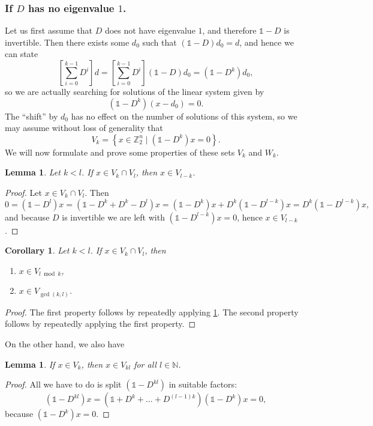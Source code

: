 \documentclass[a4paper]{article}
\theoremstyle{plain}
\newtheorem{lemma}[theorem]{Lemma}
\newtheorem{corollary}[theorem]{Corollary}
\theoremstyle{definition}
\theoremstyle{remark}
\newcommand{\I}{\mathds{1}}
\newcommand{\NN}{{\mathbb{N}}}
\newcommand{\ZZ}{{\mathbb{Z}}}
\begin{document}
\subsubsection{If \(D\) has no eigenvalue \(1\).}
Let us first assume that \(D\) does not have eigenvalue \(1\), and therefore \(\I-D\) is invertible. Then there exists some \(d_0\) such that \((\I-D)d_0 = d\), and hence we can state
\begin{equation*}
\left[\sum_{i=0}^{k-1}D^i\right] d =   \left[\sum_{i=0}^{k-1}D^i\right] (\I - D)d_0 = (\I-D^k)d_0,
\end{equation*}
so we are actually searching for solutions of the linear system given by
\begin{equation*}
(\I - D^k)(x-d_0) = 0.
\end{equation*}
The ``shift'' by \(d_0\) has no effect on the number of solutions of this system, so we may assume without loss of generality that
\begin{equation*}
V_k = \left\{x \in \ZZ_2^n  \;|\; (\I - D^k)x = 0\right\}.
\end{equation*}
We will now formulate and prove some properties of these sets \(V_k\) and \(W_k\).
\begin{lemma}
	\label{lem:vkvl=>vl-k}
	Let \(k < l\). If \(x \in V_k \cap V_l\), then \(x \in V_{l-k}\).
\end{lemma}
\begin{proof}
	Let \(x \in V_k \cap V_l\). Then
	\begin{equation*}
	0 = (\I-D^l)x = (\I-D^k +D^k - D^l)x = (\I - D^k)x + D^k(\I - D^{l-k})x = D^k(\I - D^{l-k})x,
	\end{equation*}
	and because \(D\) is invertible we are left with \((\I - D^{l-k})x = 0\), hence \(x \in V_{l-k}\).
\end{proof}
\begin{corollary}
	Let \(k < l\). If \(x \in V_k \cap V_l\), then\begin{enumerate}[(1)]
		\item \( x \in V_{l \bmod k}\),
		\item \( x \in V_{\gcd(k,l)}\).
	\end{enumerate}
\end{corollary}
\begin{proof}
	The first property follows by repeatedly applying \cref{lem:vkvl=>vl-k}. The second property follows by repeatedly applying the first property.
\end{proof}
On the other hand, we also have
\begin{lemma}
	If \(x \in V_k\), then \(x \in V_{kl}\) for all \(l \in \NN\).
\end{lemma}
\begin{proof}All we have to do is split \((\I-D^{kl})\) in suitable factors:
	\begin{equation*}
	(\I-D^{kl})x = (\I + D^k + \dots + D^{(l-1)k})(\I - D^k)x = 0,
	\end{equation*}
	because \((\I - D^k)x = 0\).
\end{proof}
\end{document}
